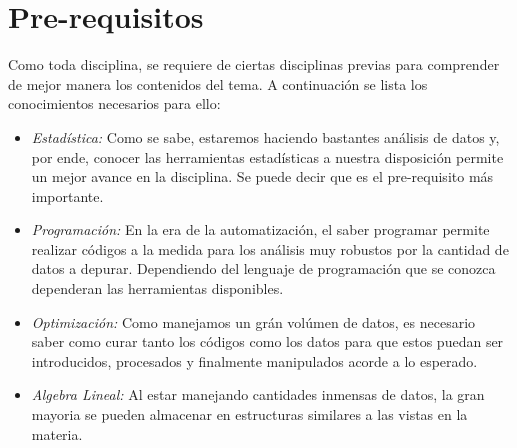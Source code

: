 \documentclass[letterpaper, 12pt]{article}
\begin{document}
    \section*{Pre-requisitos}
    \justify
    Como toda disciplina, se requiere de ciertas disciplinas previas para comprender de mejor manera los contenidos del tema. A continuación se lista los conocimientos necesarios para ello:
    \begin{itemize}
        \item \emph{Estadística:} Como se sabe, estaremos haciendo bastantes análisis de datos y, por ende, conocer las herramientas estadísticas a nuestra disposición permite un mejor avance en la disciplina. Se puede decir que es el pre-requisito más importante.
        \item \emph{Programación:} En la era de la automatización, el saber programar permite realizar códigos a la medida para los análisis muy robustos por la cantidad de datos a depurar. Dependiendo del lenguaje de programación que se conozca dependeran las herramientas disponibles.
        \item \emph{Optimización:} Como manejamos un grán volúmen de datos, es necesario saber como curar tanto los códigos como los datos para que estos puedan ser introducidos, procesados y finalmente manipulados acorde a lo esperado.
        \item \emph{Algebra Lineal:} Al estar manejando cantidades inmensas de datos, la gran mayoria se pueden almacenar en estructuras similares a las vistas en la materia.
    \end{itemize}

    \newpage
    \printbibliography[title={Referencias}]
\end{document}
